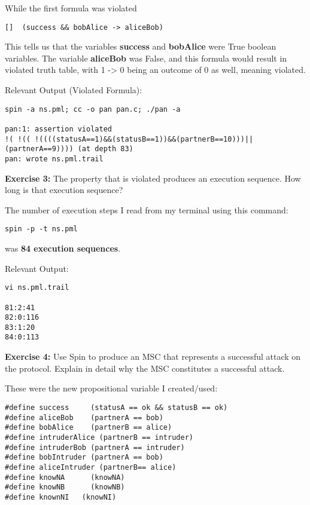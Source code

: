 \documentclass{article}
\theoremstyle{theorem}
\theoremstyle{definition}
\theoremstyle{remark}
\begin{document}
\noindent\newline While the first formula was violated
\begin{verbatim}
[]  (success && bobAlice -> aliceBob)
\end{verbatim}


\noindent\newline\newline This tells us that the variables \textbf{success} and \textbf{bobAlice} were True boolean variables. The variable \textbf{aliceBob} was False, and this formula would result in violated truth table, with 1 -> 0 being an outcome of 0 as well, meaning violated.

\noindent\newline Relevant Output (Violated Formula):
\begin{verbatim}
spin -a ns.pml; cc -o pan pan.c; ./pan -a

pan:1: assertion violated  
!( !(( !((((statusA==1)&&(statusB==1))&&(partnerB==10)))||(partnerA==9)))) (at depth 83)
pan: wrote ns.pml.trail

\end{verbatim}


\noindent\newline\textbf{Exercise 3:}
The property that is violated produces an execution sequence. How long is that execution sequence?

\noindent\newline The number of execution steps I read from my terminal using this command:
\begin{verbatim}
spin -p -t ns.pml
\end{verbatim}

\noindent was \textbf{84 execution sequences}. 

\noindent\newline Relevant Output:
\begin{verbatim}
vi ns.pml.trail

81:2:41
82:0:116
83:1:20
84:0:113
\end{verbatim}



\noindent\newline\textbf{Exercise 4:}
Use Spin to produce an MSC that represents a successful attack on the protocol. Explain in detail why the MSC constitutes a successful attack.


\noindent\newline These were the new propositional variable I created/used:
\begin{verbatim}
#define success		(statusA == ok && statusB == ok)
#define aliceBob	(partnerA == bob)
#define bobAlice	(partnerB == alice)
#define intruderAlice (partnerB == intruder)
#define intruderBob (partnerA == intruder)
#define bobIntruder (partnerA == bob)
#define aliceIntruder (partnerB== alice)
#define knowNA		(knowNA)
#define knowNB		(knowNB)
#define knownNI   (knowNI)
\end{verbatim}
\end{document}
